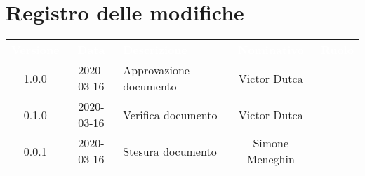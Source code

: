 \section*{Registro delle modifiche}
{
	\centering
	\begin{longtable}{ c c  C{4cm}  c  c }
		\textcolor{white}{\textbf{Versione}} & \textcolor{white}{\textbf{Data}} & \textcolor{white}{\textbf{Descrizione}} & \textcolor{white}{\textbf{Nominativo}} & \textcolor{white}{\textbf{Ruolo}}\\		
		1.0.0 & 2020-03-16 & Approvazione documento & Victor Dutca &\RdP{}\\		
		0.1.0 & 2020-03-16 & Verifica documento & Victor Dutca &\ver{}\\		
		0.0.1 & 2020-03-16 & Stesura documento & Simone Meneghin &\reda{}\\		
		
	\end{longtable}

}